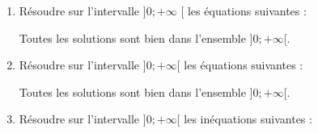 \documentclass[french]{book}
\begin{document}
\begin{corrige}

\begin{enumerate}
\item Résoudre sur l'intervalle $] 0 ;+\infty$ [ les équations suivantes :
\begin{enumerate}
Toutes les solutions sont bien dans l'ensemble $]0;+ \infty[$.
\end{enumerate}

\item Résoudre sur l'intervalle $] 0 ;+\infty[$ les équations suivantes :
\begin{enumerate}
Toutes les solutions sont bien dans l'ensemble $]0;+ \infty[$.
\end{enumerate}
\item Résoudre sur l'intervalle $]0 ;+\infty[$ les inéquations suivantes :

\begin{enumerate}
\end{enumerate}
\end{enumerate}
\end{corrige}
\end{document}
